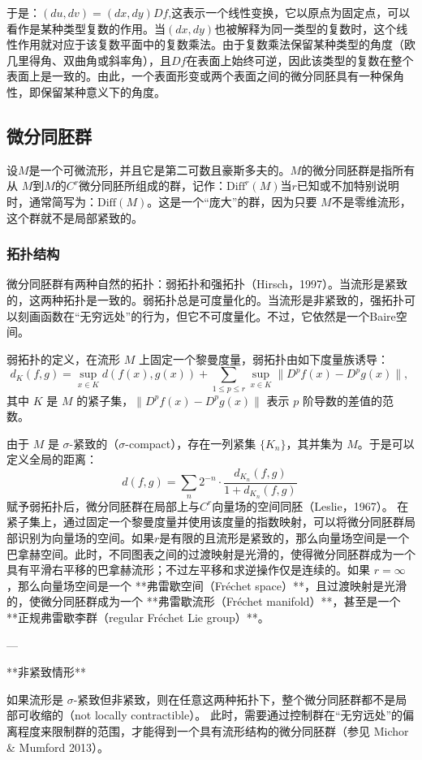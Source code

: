 于是：$(du, dv) = (dx, dy) Df$,这表示一个线性变换，它以原点为固定点，可以看作是某种类型复数的作用。当$(dx, dy)$也被解释为同一类型的复数时，这个线性作用就对应于该复数平面中的复数乘法。由于复数乘法保留某种类型的角度（欧几里得角、双曲角或斜率角），且$Df$在表面上始终可逆，因此该类型的复数在整个表面上是一致的。由此，一个表面形变或两个表面之间的微分同胚具有一种保角性，即保留某种意义下的角度。
\subsection{微分同胚群}
设$M$是一个可微流形，并且它是第二可数且豪斯多夫的。$M$的微分同胚群是指所有从 $M$到$M$的$C^r$微分同胚所组成的群，记作：$\text{Diff}^r(M)$当$r$已知或不加特别说明时，通常简写为：$\text{Diff}(M)$。这是一个“庞大”的群，因为只要 $M$不是零维流形，这个群就不是局部紧致的。
\subsubsection{拓扑结构}
微分同胚群有两种自然的拓扑：弱拓扑和强拓扑（Hirsch，1997）。当流形是紧致的，这两种拓扑是一致的。弱拓扑总是可度量化的。当流形是非紧致的，强拓扑可以刻画函数在“无穷远处”的行为，但它不可度量化。不过，它依然是一个Baire空间。

弱拓扑的定义，在流形 $M$ 上固定一个黎曼度量，弱拓扑由如下度量族诱导：
$$
d_K(f,g) = \sup_{x \in K} d(f(x), g(x)) + 
\sum_{1 \le p \le r} \sup_{x \in K} \|D^p f(x) - D^p g(x)\|,~
$$
其中 $K$ 是 $M$ 的紧子集，$\|D^p f(x) - D^p g(x)\|$ 表示 $p$ 阶导数的差值的范数。

由于 $M$ 是 $\sigma$-紧致的（$\sigma$-compact），存在一列紧集 $\{K_n\}$，其并集为 $M$。于是可以定义全局的距离：
$$
d(f,g) = \sum_n 2^{-n} \cdot 
\frac{d_{K_n}(f,g)}{1 + d_{K_n}(f,g)}~
$$
赋予弱拓扑后，微分同胚群在局部上与$C^r$向量场的空间同胚（Leslie，1967）。
在紧子集上，通过固定一个黎曼度量并使用该度量的指数映射，可以将微分同胚群局部识别为向量场的空间。如果$r$是有限的且流形是紧致的，那么向量场空间是一个巴拿赫空间。此时，不同图表之间的过渡映射是光滑的，使得微分同胚群成为一个具有平滑右平移的巴拿赫流形；不过左平移和求逆操作仅是连续的。如果 $r = \infty$，那么向量场空间是一个 **弗雷歇空间（Fréchet space）**，且过渡映射是光滑的，使微分同胚群成为一个 **弗雷歇流形（Fréchet manifold）**，甚至是一个 **正规弗雷歇李群（regular Fréchet Lie group）**。

---

**非紧致情形**

如果流形是 $\sigma$-紧致但非紧致，则在任意这两种拓扑下，整个微分同胚群都不是局部可收缩的（not locally contractible）。
此时，需要通过控制群在“无穷远处”的偏离程度来限制群的范围，才能得到一个具有流形结构的微分同胚群（参见 Michor & Mumford 2013）。
